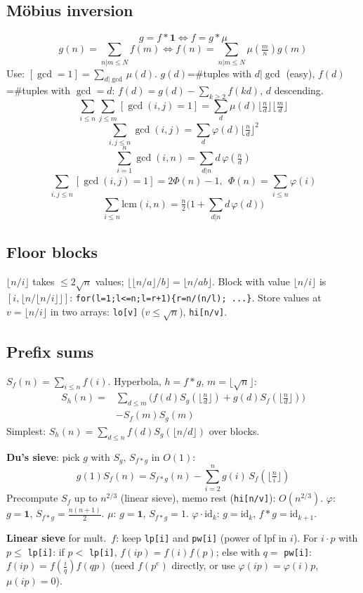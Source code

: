 \subsection{Möbius inversion}
\[ g=f*\mathbf 1 \iff f=g*\mu \]
\[ g(n)=\sum_{n|m\le N}f(m) \iff f(n)=\sum_{n|m\le N}\mu(\tfrac mn)g(m) \]
Use: $[\gcd=1]=\sum_{d|\gcd}\mu(d)$. $g(d)$=\#tuples with $d|\gcd$ (easy),
$f(d)$=\#tuples with $\gcd=d$: $f(d)=g(d)-\sum_{k\ge2}f(kd)$, $d$ descending.
\[ \sum_{i\le n}\sum_{j\le m}[\gcd(i,j)=1]=\sum_{d}\mu(d)\lfloor\tfrac nd\rfloor\lfloor\tfrac md\rfloor \]
\[ \sum_{i,j\le n}\gcd(i,j)=\sum_d\varphi(d)\lfloor\tfrac nd\rfloor^2 \]
\[ \sum_{i=1}^n\gcd(i,n)=\sum_{d|n}d\,\varphi(\tfrac nd) \]
\[ \sum_{i,j\le n}[\gcd(i,j)=1]=2\Phi(n)-1,\ \ \Phi(n)=\sum_{i\le n}\varphi(i) \]
\[ \sum_{i\le n}\mathrm{lcm}(i,n)=\tfrac n2\Big(1+\sum_{d|n}d\,\varphi(d)\Big) \]

\subsection{Floor blocks}
$\lfloor n/i\rfloor$ takes $\le 2\sqrt n$ values; $\lfloor\lfloor n/a\rfloor/b\rfloor=\lfloor n/ab\rfloor$.
Block with value $\lfloor n/i\rfloor$ is $[i,\lfloor n/\lfloor n/i\rfloor\rfloor]$:
\texttt{for(l=1;l<=n;l=r+1)\{r=n/(n/l); ...\}}.
Store values at $v=\lfloor n/i\rfloor$ in two arrays: \texttt{lo[v]} ($v\le\sqrt n$), \texttt{hi[n/v]}.

\subsection{Prefix sums}
$S_f(n)=\sum_{i\le n}f(i)$. Hyperbola, $h=f*g$, $m=\lfloor\sqrt n\rfloor$:
\begin{align*}
S_h(n)=&\textstyle\sum_{d\le m}\big(f(d)S_g(\lfloor\frac nd\rfloor)+g(d)S_f(\lfloor\frac nd\rfloor)\big)\\
&-S_f(m)S_g(m)
\end{align*}
Simplest: $S_h(n)=\sum_{d\le n}f(d)S_g(\lfloor n/d\rfloor)$ over blocks.

\textbf{Du's sieve}: pick $g$ with $S_g$, $S_{f*g}$ in $O(1)$:
\[ g(1)S_f(n)=S_{f*g}(n)-\sum_{i=2}^{n}g(i)\,S_f(\lfloor\tfrac ni\rfloor) \]
Precompute $S_f$ up to $n^{2/3}$ (linear sieve), memo rest (\texttt{hi[n/v]}):
$O(n^{2/3})$. $\varphi$: $g=\mathbf 1$, $S_{f*g}=\frac{n(n+1)}2$. $\mu$: $g=\mathbf 1$, $S_{f*g}=1$.
$\varphi\cdot\mathrm{id}_k$: $g=\mathrm{id}_k$, $f*g=\mathrm{id}_{k+1}$.

\textbf{Linear sieve} for mult.\ $f$: keep \texttt{lp[i]} and \texttt{pw[i]} (power of
lpf in $i$). For $i\cdot p$ with $p\le$ \texttt{lp[i]}: if $p<$ \texttt{lp[i]},
$f(ip)=f(i)f(p)$; else with $q=$ \texttt{pw[i]}: $f(ip)=f(\frac iq)f(qp)$
(need $f(p^e)$ directly, or use $\varphi(ip)=\varphi(i)p$, $\mu(ip)=0$).

